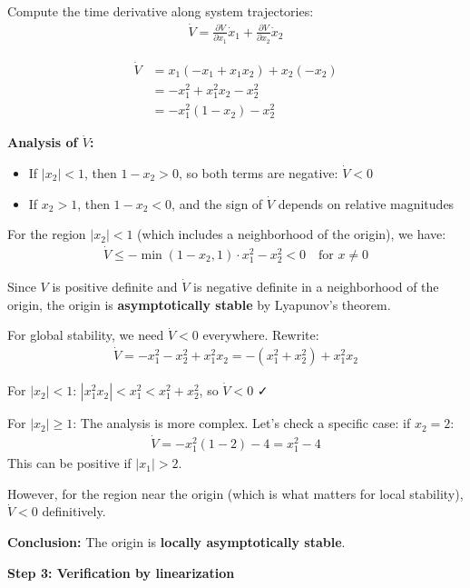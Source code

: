 \documentclass[11pt,a4paper]{article}
\begin{document}
Compute the time derivative along system trajectories:
\begin{align}
  \dot{V} = \frac{\partial V}{\partial x_1}\dot{x}_1 + \frac{\partial V}{\partial x_2}\dot{x}_2
\end{align}

\begin{align}
  \dot{V} &= x_1(-x_1 + x_1 x_2) + x_2(-x_2) \\
  &= -x_1^2 + x_1^2 x_2 - x_2^2 \\
  &= -x_1^2(1 - x_2) - x_2^2
\end{align}

\textbf{Analysis of $\dot{V}$:}
\begin{itemize}
  \item If $|x_2| < 1$, then $1 - x_2 > 0$, so both terms are negative: $\dot{V} < 0$
  \item If $x_2 > 1$, then $1 - x_2 < 0$, and the sign of $\dot{V}$ depends on relative magnitudes
\end{itemize}

For the region $|x_2| < 1$ (which includes a neighborhood of the origin), we have:
\begin{align}
  \dot{V} \leq -\min(1 - x_2, 1) \cdot x_1^2 - x_2^2 < 0 \quad \text{for } x \neq 0
\end{align}

Since $V$ is positive definite and $\dot{V}$ is negative definite in a neighborhood of the origin, the origin is \textbf{asymptotically stable} by Lyapunov's theorem.

For global stability, we need $\dot{V} < 0$ everywhere. Rewrite:
\begin{align}
  \dot{V} = -x_1^2 - x_2^2 + x_1^2 x_2 = -(x_1^2 + x_2^2) + x_1^2 x_2
\end{align}

For $|x_2| < 1$: $|x_1^2 x_2| < x_1^2 < x_1^2 + x_2^2$, so $\dot{V} < 0$ ✓

For $|x_2| \geq 1$: The analysis is more complex. Let's check a specific case: if $x_2 = 2$:
\begin{align}
  \dot{V} = -x_1^2(1-2) - 4 = x_1^2 - 4
\end{align}
This can be positive if $|x_1| > 2$.

However, for the region near the origin (which is what matters for local stability), $\dot{V} < 0$ definitively.

\textbf{Conclusion:} The origin is \textbf{locally asymptotically stable}.

\textbf{Step 3: Verification by linearization}
\end{document}
